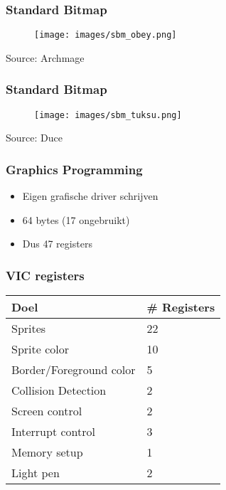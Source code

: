 
\begin{frame}
\frametitle{Standard Bitmap}

\begin{figure}
\texttt{[image: images/sbm\_obey.png]}
\end{figure}

\begin{center}
Source: Archmage
\end{center}

\end{frame}


\begin{frame}
\frametitle{Standard Bitmap}

\begin{figure}
\texttt{[image: images/sbm\_tuksu.png]}
\end{figure}

\begin{center}
Source: Duce
\end{center}

\end{frame}


\begin{frame}
\frametitle{Graphics Programming}

\begin{itemize}
\item Eigen grafische driver schrijven
\item 64 bytes (17 ongebruikt)
\item Dus 47 registers
\end{itemize}

\end{frame}


\begin{frame}
\frametitle{VIC registers}

\begin{tabular}{|l|l|}
\hline Doel & \# Registers \\ \hline
Sprites & 22 \\
Sprite color & 10 \\
Border/Foreground color & 5 \\
Collision Detection & 2 \\
Screen control & 2 \\
Interrupt control & 3 \\
Memory setup & 1 \\
Light pen & 2 \\ \hline
\end{tabular}

\end{frame}

